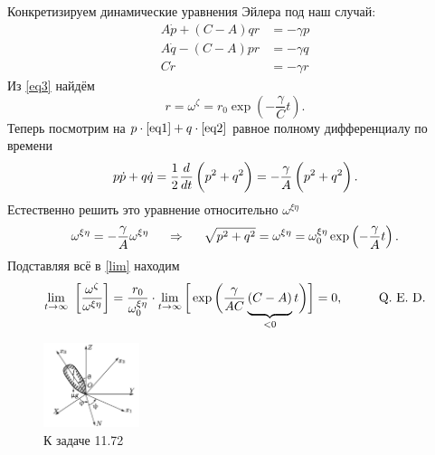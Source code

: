 Конкретизируем динамические уравнения Эйлера под наш случай:
\begin{align}
        A \dot{p} + (C-A) qr &= -\gamma p \label{eq1} \\
        A \dot{q} - (C-A) pr &= -\gamma q \label{eq2} \\
        C \dot{r} &= -\gamma r \label{eq3}
\end{align}
Из \eqref{eq3} найдём
\begin{equation*}
    r = \omega^{\zeta} = r_0 \exp \left(-\frac{\gamma}{C} t\right).
\end{equation*}
Теперь посмотрим на $p \cdot \eqref{eq1} + q \cdot \eqref{eq2}$ равное полному дифференциалу по времени
\begin{equation*}
    p \dot{p} + q \dot{q} = 
    \frac{1}{2} \frac{d }{d t} \left(p^2 + q^2 \vp \right)
    =
    - \frac{\gamma}{A} \left(\vp p^2 + q^2 \right).
\end{equation*}
Естественно решить это уравнение относительно $\omega^{\xi\eta}$
\begin{equation*}
    \omega^{\xi\eta} = - \frac{\gamma}{A} \omega^{\xi\eta}
    \hspace{0.5cm} \Rightarrow \hspace{0.5cm} 
    \sqrt{p^2+q^2} = \omega^{\xi\eta} = \omega^{\xi\eta}_0 
    \exp \left(-\frac{\gamma}{A} t\right).
\end{equation*}
Подставляя всё в \eqref{lim} находим
\begin{equation*}
    \lim_{t \to \infty} \ 
    \left[\frac{\omega^{\zeta}}{\omega^{\xi\eta}}\right] =
    \frac{r_0}{\omega^{\xi\eta}_0} \cdot
    \lim_{t \to \infty} 
\bigg[    \exp \bigg(
        \frac{\gamma}{AC} \underbrace{(C-A)\vp}_{<0} t
    \bigg) \bigg] = 0, 
    \hspace{1cm} 
    \text{Q. E. D.}
\end{equation*}


\begin{figure}[h]
    \centering
    \includegraphics[width=0.25\textwidth]{figures/LL1.png}
    \caption{К задаче 11.72}
\end{figure}

